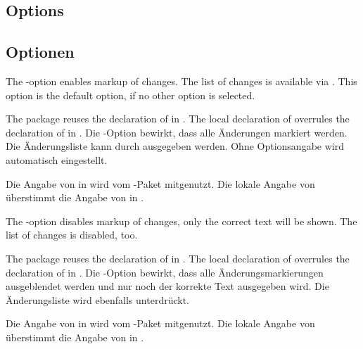 \ifENGLISH
 \subsection{Options}
\fi
	\ifGERMAN
	 \subsection{Optionen}
	\fi
\label{sec:user:options}

\ifENGLISH
 The -option enables markup of changes.
 The list of changes is available via .
 This option is the default option, if no other option is selected.

 The  package reuses the declaration of  in .
 The local declaration of  overrules the declaration of  in .
\fi
	\ifGERMAN
	 Die -Option bewirkt, dass alle Änderungen markiert werden.
	 Die Änderungsliste kann durch  ausgegeben werden.
	 Ohne Optionsangabe wird  automatisch eingestellt.

	 Die Angabe von  in  wird vom -Paket mitgenutzt.
	 Die lokale Angabe von  überstimmt die Angabe von  in .
	\fi


\ifENGLISH
 The -option disables markup of changes, only the correct text will be shown.
 The list of changes is disabled, too.

 The  package reuses the declaration of  in .
 The local declaration of  overrules the declaration of  in .
\fi
	\ifGERMAN
	 Die -Option bewirkt, dass alle Änderungsmarkierungen ausgeblendet werden und nur noch der korrekte Text ausgegeben wird.
	 Die Änderungsliste wird ebenfalls unterdrückt.

	 Die Angabe von  in  wird vom -Paket mitgenutzt.
	 Die lokale Angabe von  überstimmt die Angabe von  in .
	\fi


